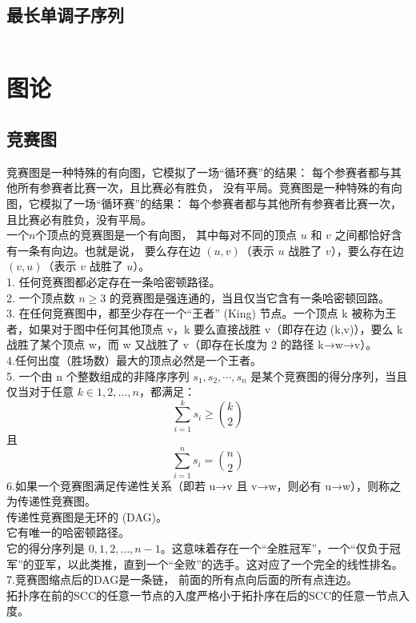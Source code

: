 \documentclass[titlepage, a4paper]{report}
\newcommand{\cppcode}[1]{  
    \inputminted[mathescape]{cpp}{source/#1}  
}
\begin{document}
\section{最长单调子序列}
\cppcode{LIS.cpp}





\chapter{图论}

\section{竞赛图}

竞赛图是一种特殊的有向图，它模拟了一场“循环赛”的结果：
每个参赛者都与其他所有参赛者比赛一次，且比赛必有胜负，
没有平局。竞赛图是一种特殊的有向图，它模拟了一场“循环赛”的结果：
每个参赛者都与其他所有参赛者比赛一次，且比赛必有胜负，没有平局。\\
一个$n$个顶点的竞赛图是一个有向图，
其中每对不同的顶点 $u$ 和 $v$ 之间都恰好含有一条有向边。也就是说，
要么存在边 $(u,v)$（表示 $u$ 战胜了 $v$），要么存在边 $(v,u)$（表示 $v$ 战胜了 $u$）。\\
1. 任何竞赛图都必定存在一条哈密顿路径。\\
2. 一个顶点数 $n\ge 3$ 的竞赛图是强连通的，当且仅当它含有一条哈密顿回路。\\
3. 在任何竞赛图中，都至少存在一个“王者” (King) 节点。一个顶点 k 被称为王者，如果对于图中任何其他顶点 v，k 要么直接战胜 v（即存在边 (k,v)），要么 k 战胜了某个顶点 w，而 w 又战胜了 v（即存在长度为 2 的路径 k→w→v）。\\
4.任何出度（胜场数）最大的顶点必然是一个王者。\\
5. 一个由 n 个整数组成的非降序序列 $s_1,s_2,\cdots,s_n$
  是某个竞赛图的得分序列，当且仅当对于任意 $k\in {1,2,…,n}$，都满足：
  $$
  \sum_{i=1}^{k} s_i \ge \binom{k}{2}
  $$
  且
  $$
  \sum_{i=1}^{n} s_i = \binom{n}{2}
  $$
6.如果一个竞赛图满足传递性关系（即若 u→v 且 v→w，则必有 u→w），则称之为传递性竞赛图。 \\ 
传递性竞赛图是无环的 (DAG)。\\
它有唯一的哈密顿路径。\\
它的得分序列是 $0,1,2,…,n−1$。这意味着存在一个“全胜冠军”，一个“仅负于冠军”的亚军，以此类推，直到一个“全败”的选手。这对应了一个完全的线性排名。\\

7.竞赛图缩点后的DAG是一条链， 前面的所有点向后面的所有点连边。\\
拓扑序在前的SCC的任意一节点的入度严格小于拓扑序在后的SCC的任意一节点入度。\\
\end{document}

